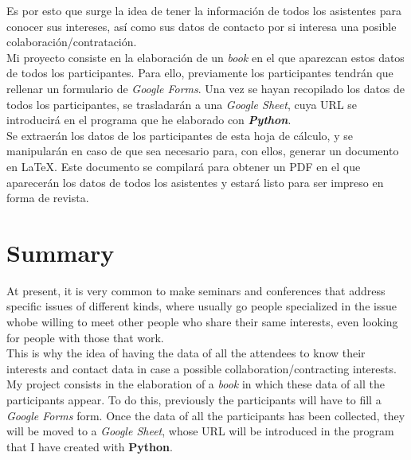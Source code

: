 \documentclass[a4paper, 12pt]{book}
\begin{document}
Es por esto que surge la idea de tener la información de todos los asistentes para conocer sus intereses, así como sus datos de contacto por si interesa una posible colaboración/contratación.\\

Mi proyecto consiste en la elaboración de un \textit{book} en el que aparezcan estos datos de todos los participantes. Para ello, previamente los participantes tendrán que rellenar un formulario de \textit{Google Forms}. Una vez se hayan recopilado los datos de todos los participantes, se trasladarán a una \textit{Google Sheet}, cuya URL se introducirá en el programa que he elaborado con \textbf{\textit{Python}}.\\

Se extraerán los datos de los participantes de esta hoja de cálculo, y se manipularán en caso de que sea necesario para, con ellos, generar un documento en \LaTeX. Este documento se compilará para obtener un PDF en el que aparecerán los datos de todos los asistentes y estará listo para ser impreso en forma de revista.



\chapter*{Summary}

At present, it is very common to make seminars and conferences that address specific issues of different kinds, where usually go people specialized in the issue whobe willing to meet other people who share their same interests, even looking for people with those that work.\\

This is why the idea of having the data of all the attendees to know their interests and contact data in case a possible collaboration/contracting interests.\\

My project consists in the elaboration of a \textit{book} in which these data of all the participants appear. To do this, previously the participants will have to fill a \textit{Google Forms} form. Once the data of all the participants has been collected, they will be moved to a \textit{Google Sheet}, whose URL will be introduced in the program that I have created with \textbf{Python}.\\
\end{document}
